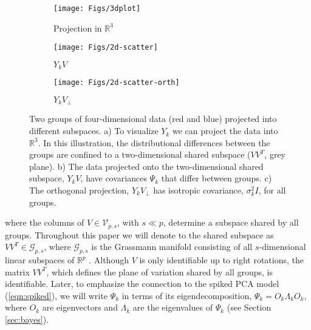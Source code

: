 \documentclass[12pt]{article}
\begin{document}
\begin{figure}[t]
    \centering
    \begin{subfigure}[b]{0.25\textwidth}
        \texttt{[image: Figs/3dplot]}
        \caption{Projection in $\mathbb{R}^3$}
        \label{fig:3dplot}
    \end{subfigure}
\quad
    \begin{subfigure}[b]{0.25\textwidth}
        \texttt{[image: Figs/2d-scatter]}
        \caption{$Y_kV$}
        \label{fig:2dscatter}
    \end{subfigure}
\quad 
    \begin{subfigure}[b]{0.25\textwidth}
        \texttt{[image: Figs/2d-scatter-orth]}
        \caption{$Y_kV_{\perp}$}
        \label{fig:2dscatterorth}
    \end{subfigure}
    \caption{ Two groups of four-dimensional data (red and blue)
      projected into different subspaces.  a) To visualize $Y_k$ we
      can project the data into $\mathbb{R}^3$.  In this illustration, the
      distributional differences between the groups are confined to a
      two-dimensional shared subspace ($VV^T$, grey plane).  b) The
      data projected onto the two-dimensional shared subspace,
      $Y_kV$, have covariances $\Psi_k$ that differ between
      groups. c) The orthogonal projection, $Y_kV_{\perp}$
      has isotropic covariance, $\sigma_k^2I$, for all groups.  }
\label{fig:shared}
\end{figure}

%
\noindent where the columns of $V \in \mathcal{V}_{p, s}$, with
$s \ll p$, determine a subspace shared by all groups.  Throughout this
paper we will denote to the shared subspace as
$VV^T \in \mathcal G_{p,s}$, where $\mathcal G_{p,s}$ is the
Grassmann manifold consisting of all $s$-dimensional linear subspaces
of $\mathbb{R}^p$ \citep{Chikuse2012}.  Although $V$ is only
identifiable up to right rotations, the matrix $VV^T$, which defines
the plane of variation shared by all groups, is identifiable.  Later,
to emphasize the connection to the spiked PCA model
(\ref{eqn:spiked}), we will write $\Psi_k$ in terms of its
eigendecomposition, $\Psi_k = O_k\Lambda_kO_k$, where $O_k$ are
eigenvectors and $\Lambda_k$ are the eigenvalues of $\Psi_k$ (see
Section \ref{sec:bayes}).
\end{document}
